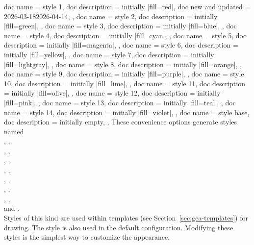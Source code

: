 \documentclass[a4paper,11pt]{article}
\begin{document}
\begin{docKeys}
  [
      doc parameter   = {=\marg{path style}},
      doc keypath     = tikz/geomarray,
  ]
  {
    {
      doc name        = style 1,
      doc description = {initially |fill=red|},
      doc new and updated = {2026-03-18}{2026-04-14},
    },
    {
      doc name        = style 2,
      doc description = {initially |fill=green|},
    },
    {
      doc name        = style 3,
      doc description = {initially |fill=blue|},
    },
    {
      doc name        = style 4,
      doc description = {initially |fill=cyan|},
    },
    {
      doc name        = style 5,
      doc description = {initially |fill=magenta|},
    },
    {
      doc name        = style 6,
      doc description = {initially |fill=yellow|},
    },
    {
      doc name        = style 7,
      doc description = {initially |fill=lightgray|},
    },
    {
      doc name        = style 8,
      doc description = {initially |fill=orange|},
    },
    {
      doc name        = style 9,
      doc description = {initially |fill=purple|},
    },
    {
      doc name        = style 10,
      doc description = {initially |fill=lime|},
    },
    {
      doc name        = style 11,
      doc description = {initially |fill=olive|},
    },
    {
      doc name        = style 12,
      doc description = {initially |fill=pink|},
    },
    {
      doc name        = style 13,
      doc description = {initially |fill=teal|},
    },
    {
      doc name        = style 14,
      doc description = {initially |fill=violet|},
    },
    {
      doc name        = style base,
      doc description = {initially empty},
    },
  }
  These convenience options generate styles named\\
  , ,\\
  , ,\\
  , ,\\
  , ,\\
  , ,\\
  , ,\\
  , ,\\
  and .\\
  Styles of this kind are used within templates (see
  Section~\ref{sec:gea-templates}) for drawing. The style
   is also used in the default configuration.
  Modifying these styles is the simplest way to customize the appearance.


\end{docKeys}
\end{document}

